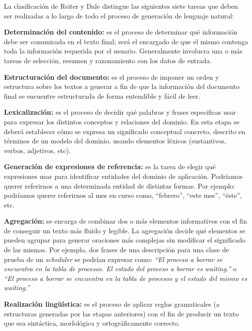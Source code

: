 La clasificación de Reiter y Dale distingue las siguientes siete tareas que deben ser realizadas a lo largo de todo el proceso de generación de lenguaje natural: 

\bigskip
\noindent
\textbf{Determinación del contenido:} es el proceso de determinar qué información debe ser comunicada en el texto final; será el encargado de que el mismo contenga toda la información requerida por el usuario. Generalmente involucra una o más tareas de selección, resumen y razonamiento con los datos de entrada.

\bigskip
\noindent
\textbf{Estructuración del documento:} es el proceso de imponer un orden y estructura sobre los textos a generar a fin de que la información del documento final se encuentre estructurada de forma entendible y fácil de leer.

\bigskip
\noindent
\textbf{Lexicalización:} es el proceso de decidir qué palabras y frases especificas usar para expresar los distintos conceptos y relaciones del dominio. En esta etapa se deberá establecer cómo se expresa un significado conceptual concreto, descrito en términos de un modelo del dominio, usando elementos léxicos (sustantivos, verbos, adjetivos, etc).

\bigskip
\noindent
\textbf{Generación de expresiones de referencia:} es la tarea de elegir qué expresiones usar para identificar entidades del dominio de aplicación. Podríamos querer referirnos a una determinada entidad de distintas formas. Por ejemplo: podríamos querer referirnos al mes en curso como, ``febrero'', ``este mes'', ``éste'', etc.

\bigskip
\noindent
\textbf{Agregación:} se encarga de combinar dos o más elementos informativos con el fin de conseguir un texto más fluido y legible. La agregación decide qué elementos se pueden agrupar para generar oraciones más complejas sin modificar el significado de las mismas. Por ejemplo, dos frases de una descripción para una clase de prueba de un \textit{scheduler} se podrían expresar como:
\emph{``El proceso a borrar se encuentra en la tabla de procesos. El estado del proceso a borrar es waiting.''} o \emph{``El proceso a borrar se encuentra en la tabla de procesos y el estado del mismo es waiting.''}

\bigskip
\noindent
\textbf{Realización lingüística:} es el proceso de aplicar reglas gramaticales (a estructuras generadas por las etapas anteriores) con el fin de producir un texto que sea sintáctica, morfológica y ortográficamente correcto.

